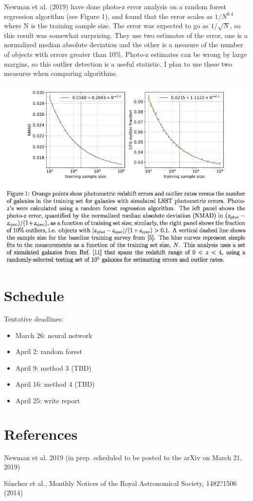 \documentclass[13pt]{amsart}
\begin{document}
Newman et al. (2019) have done photo-z error analysis on a random forest regression algorithm (see Figure 1), and found that the error scales as $1/N^{0.4}$ where N is the training sample size. The error was expected to go as $1/\sqrt{N}$, so this result was somewhat surprising. They use two estimates of the error, one is a normalized median absolute deviation and the other is a measure of the number of objects with errors greater than 10\%. Photo-z estimates can be wrong by large margins, so this outlier detection is a useful statistic. I plan to use these two measures when comparing algorithms.

\includegraphics[width=\textwidth]{photozerrors.png}


\section{Schedule}

Tentative deadlines:

\begin{itemize}
\item March 26: neural network
\item April 2: random forest
\item April 9: method 3 (TBD)
\item April 16: method 4 (TBD)
\item April 25: write report
\end{itemize}




\section{References}
Newman et al. 2019 (in prep. scheduled to be posted to the arXiv on March 21, 2019)

S\'anchez et al., Monthly Notices of the Royal Astronomical Society, 1482?1506 (2014)



 
\end{document}
